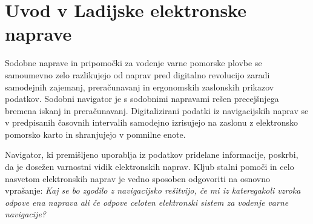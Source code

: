 %
\chapter{Uvod v Ladijske elektronske naprave}
\label{intro_P} %
 
Sodobne naprave in pripomočki za vodenje varne pomorske plovbe se samoumevno zelo razlikujejo od naprav pred digitalno revolucijo zaradi samodejnih zajemanj, preračunavanj in ergonomskih zaslonskih prikazov podatkov. Sodobni navigator je s sodobnimi napravami rešen precejšnjega bremena iskanj in preračunavanj. Digitalizirani podatki iz navigacijskih naprav se v predpisanih časovnih intervalih samodejno izrisujejo na zaslonu z elektronsko pomorsko karto in shranjujejo v pomnilne enote. 

Navigator, ki premišljeno uporablja iz podatkov pridelane informacije, poskrbi, da je dosežen varnostni vidik elektronskih naprav. Kljub stalni pomoči in celo nasvetom elektronskih naprav je vedno sposoben odgovoriti na osnovno vprašanje: \textit{Kaj se bo zgodilo z navigacijsko rešitvijo, če mi iz kateregakoli vzroka odpove ena naprava ali če odpove celoten elektronski sistem za vodenje varne navigacije?}




